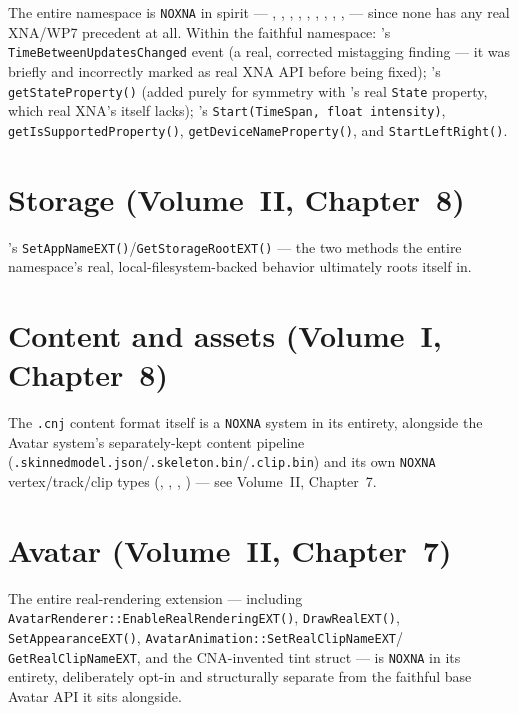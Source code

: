 The entire  namespace is \texttt{NOXNA} in spirit --- ,
, , , ,
, , , ,
 --- since none has any real XNA/WP7 precedent at all. Within the
faithful  namespace: 's
\texttt{TimeBetweenUpdatesChanged} event (a real, corrected mistagging finding --- it was
briefly and incorrectly marked as real XNA API before being fixed); 's
\texttt{getStateProperty()} (added purely for symmetry with 's real
\texttt{State} property, which real XNA's  itself lacks);
's \texttt{Start(TimeSpan, float intensity)},
\texttt{getIsSupportedProperty()}, \texttt{getDeviceNameProperty()}, and
\texttt{StartLeftRight()}.

\section{Storage (Volume~II, Chapter~8)}

's \texttt{SetAppNameEXT()}/\texttt{GetStorageRootEXT()} --- the two
methods the entire namespace's real, local-filesystem-backed behavior ultimately roots
itself in.

\section{Content and assets (Volume~I, Chapter~8)}

The \texttt{.cnj} content format itself is a \texttt{NOXNA} system in its entirety, alongside
the Avatar system's separately-kept  content pipeline
(\texttt{.skinnedmodel.json}/\texttt{.skeleton.bin}/\texttt{.clip.bin}) and its own
\texttt{NOXNA} vertex/track/clip types (,
, , ) --- see Volume~II,
Chapter~7.

\section{Avatar (Volume~II, Chapter~7)}

The entire  real-rendering extension --- including
\texttt{AvatarRenderer::EnableRealRenderingEXT()}, \texttt{DrawRealEXT()},
\texttt{SetAppearanceEXT()}, \texttt{AvatarAnimation::SetRealClipNameEXT}/%
\texttt{GetRealClipNameEXT}, and the CNA-invented  tint struct
--- is \texttt{NOXNA} in its entirety, deliberately opt-in and structurally separate from the
faithful base Avatar API it sits alongside.

